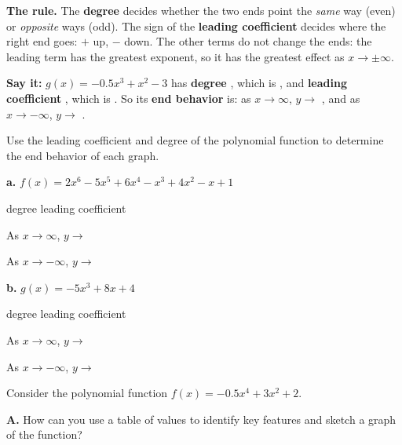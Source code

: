 \vspace{4pt}
\textbf{The rule.} The \textbf{degree} decides whether the two ends point the \emph{same} way (even) or \emph{opposite} ways (odd). The sign of the \textbf{leading coefficient} decides where the right end goes: $+$ up, $-$ down. The other terms do not change the ends: the leading term has the greatest exponent, so it has the greatest effect as $x\to\pm\infty$.

\textbf{Say it:} $g(x)=-0.5x^3+x^2-3$ has \textbf{degree} \blank[1.2cm], which is \blank[1.6cm], and \textbf{leading coefficient} \blank[1.2cm], which is \blank[1.8cm]. So its \textbf{end behavior} is: as $x\to\infty$, $y\to$ \blank[1.2cm], and as $x\to-\infty$, $y\to$ \blank[1.2cm].

\newpage
{}
Use the leading coefficient and degree of the polynomial function to determine the end behavior of each graph.

\begin{minipage}[t]{0.48\textwidth}
\textbf{a.} $f(x)=2x^6-5x^5+6x^4-x^3+4x^2-x+1$

\vspace{4pt}
degree \blank[1cm] \quad leading coefficient \blank[1cm]

\vspace{6pt}
As $x\to\infty$, $y\to$ \blank[1.4cm]

\vspace{6pt}
As $x\to-\infty$, $y\to$ \blank[1.4cm]
\end{minipage}\hfill
\begin{minipage}[t]{0.48\textwidth}
\textbf{b.} $g(x)=-5x^3+8x+4$

\vspace{4pt}
degree \blank[1cm] \quad leading coefficient \blank[1cm]

\vspace{6pt}
As $x\to\infty$, $y\to$ \blank[1.4cm]

\vspace{6pt}
As $x\to-\infty$, $y\to$ \blank[1.4cm]
\end{minipage}

\vspace{6pt}
Consider the polynomial function $f(x)=-0.5x^4+3x^2+2$.

\textbf{A.} How can you use a table of values to identify key features and sketch a graph of the function?

